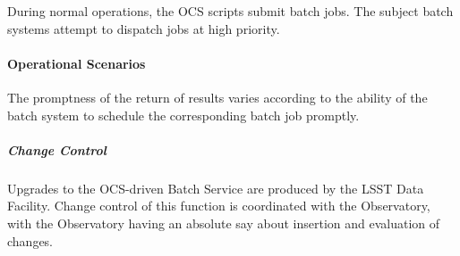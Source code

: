 During normal operations, the OCS scripts submit batch jobs. The subject batch systems attempt to dispatch jobs at high priority.

\paragraph{Operational Scenarios}

The promptness of the return of results varies according to the ability
of the batch system to schedule the corresponding batch job promptly.

\subparagraph{Change Control}

Upgrades to the OCS-driven Batch Service are produced by the LSST Data Facility. Change control
of this function is coordinated with the Observatory, with the Observatory having an absolute say
about insertion and evaluation of changes.
